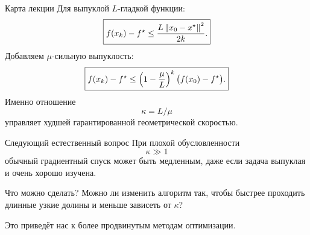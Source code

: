 \begin{frame}{Карта лекции}
\small
Для выпуклой $L$-гладкой функции:
\[
\boxed{
f(x_k)-f^\star
\le
\frac{L\left\lVert x_0-x^\star\right\rVert^2}{2k}.
}
\]
Добавляем $\mu$-сильную выпуклость:
\[
\boxed{
f(x_k)-f^\star
\le
\left(1-\frac\mu L\right)^k\bigl(f(x_0)-f^\star\bigr).
}
\]
Именно отношение
\[
\boxed{\kappa=L/\mu}
\]
управляет худшей гарантированной геометрической скоростью.
\end{frame}

\begin{frame}{Следующий естественный вопрос}
\small
При плохой обусловленности
\[
\kappa\gg1
\]
обычный градиентный спуск может быть медленным, даже если задача выпуклая и очень хорошо изучена.

\vspace{0.6em}
\begin{alertblock}{Что можно сделать?}
Можно ли изменить алгоритм так, чтобы быстрее проходить длинные узкие долины и меньше зависеть от $\kappa$?
\end{alertblock}

Это приведёт нас к более продвинутым методам оптимизации.
\end{frame}

